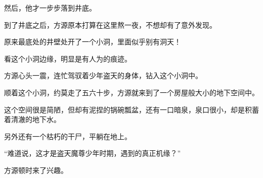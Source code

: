 \begin{this_body}
然后，他才一步步落到井底。

到了井底之后，方源原本打算在这里熬一夜，不想却有了意外发现。

原来最底处的井壁处开了一个小洞，里面似乎别有洞天！

看这个小洞边缘，明显是有人为的痕迹。

方源心头一震，连忙驾驭着少年盗天的身体，钻入这个小洞中。

顺着这个小洞，约莫走了五六十步，方源就来到了一个房屋般大小的地下空间中。

这个空间很是简陋，但却有泥捏的锅碗瓢盆，还有一口暗泉，泉口很小，却是积蓄着清澈的地下水。

另外还有一个枯朽的干尸，平躺在地上。

“难道说，这才是盗天魔尊少年时期，遇到的真正机缘？”

方源顿时来了兴趣。

\end{this_body}

